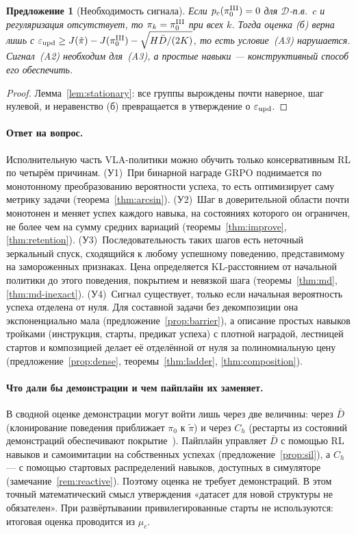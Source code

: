 \documentclass[11pt,a4paper]{article}
\theoremstyle{plain}
\newtheorem{proposition}[theorem]{Предложение}
\theoremstyle{definition}
\theoremstyle{remark}
\newcommand{\cD}{\mathcal{D}}
\newcommand{\pit}{\tilde\pi}
\begin{document}
\begin{proposition}[Необходимость сигнала]\label{prop:necessity}
Если $p_c(\pi^{\rm III}_0)=0$ для $\cD$-п.в.\ $c$ и регуляризация отсутствует, то $\pi_k=\pi^{\rm III}_0$ при всех $k$. Тогда оценка (б) верна лишь с $\varepsilon_{\rm upd}\ge J(\pit)-J(\pi^{\rm III}_0)-\sqrt{H\bar D/(2K)}$, то есть условие~(A3) нарушается. Сигнал~(A2) необходим для~(A3), а простые навыки --- конструктивный способ его обеспечить.
\end{proposition}
\begin{proof}
Лемма~\ref{lem:stationary}: все группы вырождены почти наверное, шаг нулевой, и неравенство (б) превращается в утверждение о $\varepsilon_{\rm upd}$.
\end{proof}

\paragraph{Ответ на вопрос.} Исполнительную часть VLA-политики можно обучить только консервативным RL по четырём причинам.
(У1)~При бинарной награде GRPO поднимается по монотонному преобразованию вероятности успеха, то есть оптимизирует саму метрику задачи (теорема~\ref{thm:arcsin}).
(У2)~Шаг в доверительной области почти монотонен и меняет успех каждого навыка, на состояниях которого он ограничен, не более чем на сумму средних вариаций (теоремы~\ref{thm:improve}, \ref{thm:retention}).
(У3)~Последовательность таких шагов есть неточный зеркальный спуск, сходящийся к любому успешному поведению, представимому на замороженных признаках. Цена определяется KL-расстоянием от начальной политики до этого поведения, покрытием и невязкой шага (теоремы~\ref{thm:md}, \ref{thm:md-inexact}).
(У4)~Сигнал существует, только если начальная вероятность успеха отделена от нуля. Для составной задачи без декомпозиции она экспоненциально мала (предложение~\ref{prop:barrier}), а описание простых навыков тройками (инструкция, старты, предикат успеха) с плотной наградой, лестницей стартов и композицией делает её отделённой от нуля за полиномиальную цену (предложение~\ref{prop:dense}, теоремы~\ref{thm:ladder}, \ref{thm:composition}).

\paragraph{Что дали бы демонстрации и чем пайплайн их заменяет.} В сводной оценке демонстрации могут войти лишь через две величины:
через $\bar D$ (клонирование поведения приближает $\pi_0$ к $\pit$)
и через $C_h$ (рестарты из состояний демонстраций обеспечивают покрытие~\cite{salimans-chen}).
Пайплайн управляет $\bar D$ с помощью RL навыков и самоимитации на собственных успехах (предложение~\ref{prop:sil}), а $C_h$ --- с помощью стартовых распределений навыков, доступных в симуляторе (замечание~\ref{rem:reactive}). Поэтому оценка не требует демонстраций. В этом точный математический смысл утверждения «датасет для новой структуры не обязателен». При развёртывании привилегированные старты не используются: итоговая оценка проводится из $\mu_c$.
\end{document}

